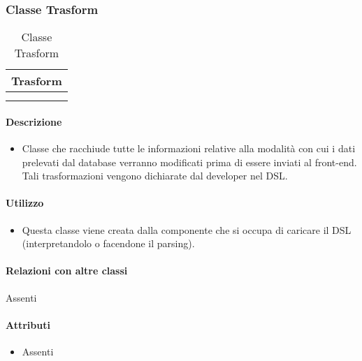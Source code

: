 \subsubsection{Classe Trasform}

\begin{table}[ht]
\begin{center}
\bgroup
\setlength{\arrayrulewidth}{0.6mm}
\def\arraystretch{1}
\begin{tabular}{ | p{12cm} | }
\hline
\centerline{\textbf{Trasform}}
\\ \hline
 \\ 
\hline
 \\ 
\hline
\end{tabular}
\egroup
\caption{Classe Trasform}
\end{center}
\end{table}

\paragraph*{Descrizione}
\begin{itemize}
\item[] Classe che racchiude tutte le informazioni relative alla modalità con cui i dati prelevati dal database verranno modificati prima di essere inviati al front-end.
Tali trasformazioni vengono dichiarate dal developer nel DSL.
\end{itemize}

\paragraph*{Utilizzo}
\begin{itemize}
\item[] Questa classe viene creata dalla componente che si occupa di caricare il DSL (interpretandolo o facendone il parsing).
\end{itemize}

\paragraph*{Relazioni con altre classi}
Assenti

\paragraph*{Attributi}
\begin{itemize}
\item[] Assenti
\end{itemize}

